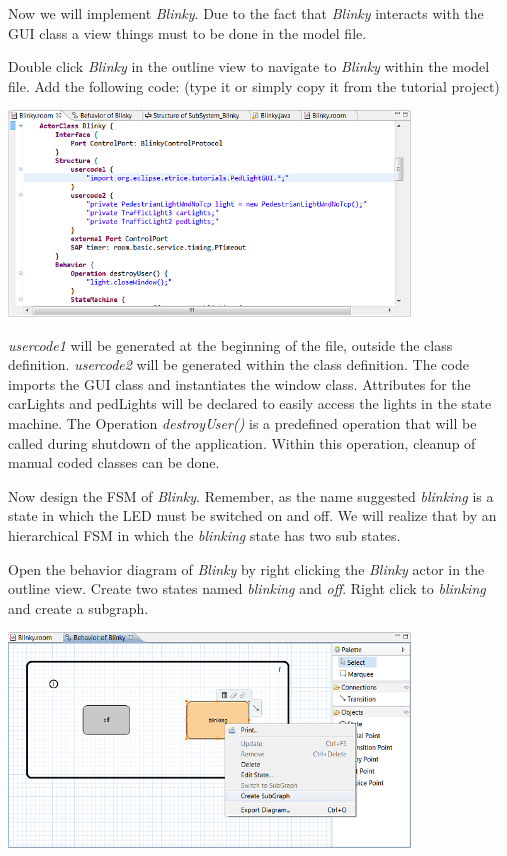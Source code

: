 Now we will implement \textit{Blinky}. Due to the fact that \textit{Blinky} interacts with the GUI class a 
view things must to be done in the model file.

Double click \textit{Blinky} in the outline view to navigate to \textit{Blinky} within the model file.
Add the following code:
(type it or simply copy it from the tutorial project)

\includegraphics[width=0.8\textwidth]{images/020-Blinky12.png}

\textit{usercode1} will be generated at the beginning of the file, outside the class definition. 
\textit{usercode2} will be generated within the class definition. The code imports the GUI class and 
instantiates the window class. Attributes for the carLights and pedLights will be declared to easily 
access the lights in the state machine.
The Operation \textit{destroyUser()} is a predefined operation that will be called during shutdown of the 
application. Within this operation, cleanup of manual coded classes can be done.
 
Now design the FSM of \textit{Blinky}. Remember, as the name suggested \textit{blinking} is a state in 
which the LED must be switched on and off. We will realize that by an hierarchical FSM in which the 
\textit{blinking} state has two sub states.

Open the behavior diagram of \textit{Blinky} by right clicking the \textit{Blinky} actor in the outline 
view. Create two states named \textit{blinking} and \textit{off}. Right click to \textit{blinking} and 
create a subgraph.

\includegraphics[width=0.8\textwidth]{images/020-Blinky13.png}

